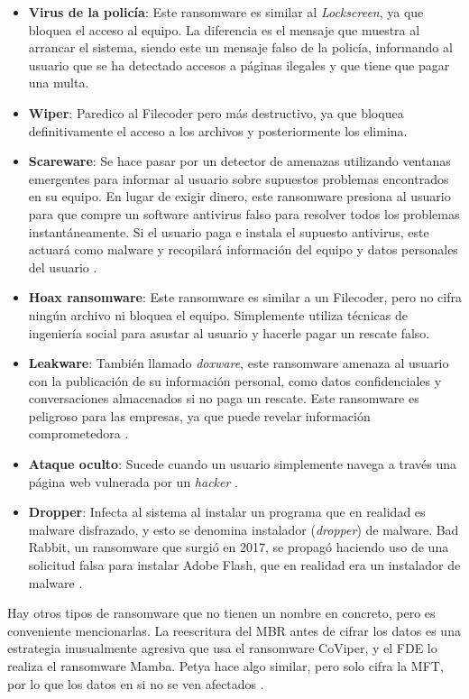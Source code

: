 \begin{itemize}
\item \textbf{Virus de la policía}: Este ransomware es similar al \textit{Lockscreen}, ya que bloquea el acceso al equipo. La diferencia es el mensaje que muestra al arrancar el sistema, siendo este un mensaje falso de la policía, informando al usuario que se ha detectado accesos a páginas ilegales y que tiene que pagar una multa. 
\item \textbf{Wiper}: Paredico al Filecoder pero más destructivo, ya que bloquea definitivamente el acceso a los archivos y posteriormente los elimina.
\item \textbf{Scareware}: Se hace pasar por un detector de amenazas utilizando ventanas emergentes para informar al usuario sobre supuestos problemas encontrados en su equipo. En lugar de exigir dinero, este ransomware presiona al usuario para que compre un software antivirus falso para resolver todos los problemas instantáneamente. Si el usuario paga e instala el supuesto antivirus, este actuará como malware y recopilará información del equipo y datos personales del usuario \cite{84}.
\item \textbf{Hoax ransomware}: Este ransomware es similar a un Filecoder, pero no cifra ningún archivo ni bloquea el equipo. Simplemente utiliza técnicas de ingeniería social para asustar al usuario y hacerle pagar un rescate falso.
\item \textbf{Leakware}: También llamado \textit{doxware}, este ransomware amenaza al usuario con la publicación de su información personal, como datos confidenciales y conversaciones almacenados si no paga un rescate. Este ransomware es peligroso para las empresas, ya que puede revelar información comprometedora \cite{85}.
\item \textbf{Ataque oculto}: Sucede cuando un usuario simplemente navega a través una página web vulnerada por un \textit{hacker} \cite{82}.
\item \textbf{Dropper}: Infecta al sistema al instalar un programa que en realidad es malware disfrazado, y esto se denomina instalador (\textit{dropper}) de malware. Bad Rabbit, un ransomware que surgió en 2017, se propagó haciendo uso de una solicitud falsa para instalar Adobe Flash, que en realidad era un instalador de malware \cite{83}.
\end{itemize}

Hay otros tipos de ransomware que no tienen un nombre en concreto, pero es conveniente mencionarlas. La reescritura del \gls{MBR} antes de cifrar los datos es una estrategia inusualmente agresiva que usa el ransomware CoViper, y el \gls{FDE} lo realiza el ransomware Mamba. Petya hace algo similar, pero solo cifra la \gls{MFT}, por lo que los datos en si no se ven afectados \cite{82}.


